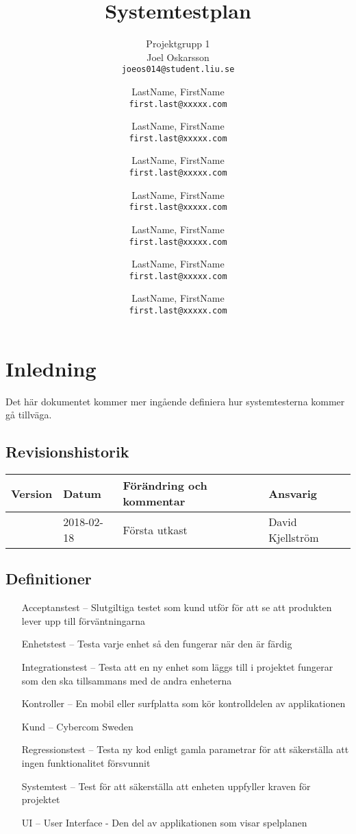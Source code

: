 \documentclass[10pt]{article}
\title{Systemtestplan}
\author{
	Projektgrupp 1\\
	Joel Oskarsson\\
	\texttt{joeos014@student.liu.se}
	\and
	LastName, FirstName\\
	\texttt{first.last@xxxxx.com}
	\and
	LastName, FirstName\\
	\texttt{first.last@xxxxx.com}
	\and
	LastName, FirstName\\
	\texttt{first.last@xxxxx.com}
	\and
	LastName, FirstName\\
	\texttt{first.last@xxxxx.com}
  	\and
  	LastName, FirstName\\
  	\texttt{first.last@xxxxx.com}
  	\and
  	LastName, FirstName\\
  	\texttt{first.last@xxxxx.com}
  	\and
  	LastName, FirstName\\
  	\texttt{first.last@xxxxx.com}
}
\begin{document}
\maketitle
\pagebreak
\tableofcontents
\pagebreak
\section{Inledning}
	Det här dokumentet kommer mer ingående definiera hur systemtesterna kommer gå tillväga.
	\subsection{Revisionshistorik}

	
	\begin{center}
 	   \begin{tabular}{| l | l | l |  l | }
 	       \hline
 	       \textbf{Version} & \textbf{Datum} & \textbf{Förändring och kommentar} & \textbf{Ansvarig} \\
 	       \hline
 	       \centering 0.1 & 2018-02-18 & Första utkast & David Kjellström\\
 	       \hline
 	   \end{tabular}
	\end{center}


	\subsection{Definitioner}
		\begin{itemize}
		\item [Acceptanstest --]Slutgiltiga testet som kund utför för att se att produkten lever upp till förväntningarna
		\item [Enhetstest --]Testa varje enhet så den fungerar när den är färdig
		\item [Integrationstest --]Testa att en ny enhet som läggs till i projektet fungerar som den ska tillsammans med de andra enheterna
		\item [Kontroller --]En mobil eller surfplatta som kör kontrolldelen av applikationen
		\item [Kund --]Cybercom Sweden
		\item [Regressionstest --]Testa ny kod enligt gamla parametrar för att säkerställa att ingen funktionalitet försvunnit
		\item [Systemtest --]Test för att säkerställa att enheten uppfyller kraven för projektet		
		\item [UI --]User Interface - Den del av applikationen som visar spelplanen
		\end{itemize}
	
\end{document}
